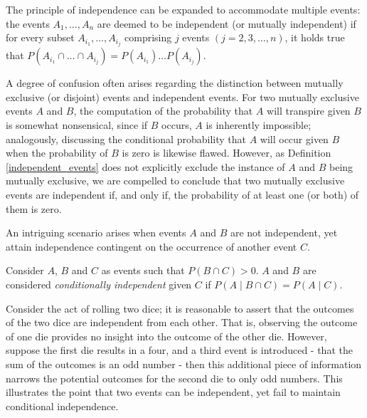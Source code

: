 The principle of independence can be expanded to accommodate multiple events: the events $A_{1}, \ldots, A_{n}$ are deemed to be independent (or mutually independent) if for every subset $A_{i_1}, \ldots, A_{i_j}$ comprising $j$ events $\left( j = 2, 3, \ldots, n \right)$, it holds true that $P \left( A_{i_1} \cap \ldots \cap A_{i_j} \right) = P \left( A_{i_1} \right) \ldots P \left( A_{i_j}\right)$.

\begin{example}
A degree of confusion often arises regarding the distinction between mutually exclusive (or disjoint) events and independent events. For two mutually exclusive events $A$ and $B$, the computation of the probability that $A$ will transpire given $B$ is somewhat nonsensical, since if $B$ occurs, $A$ is inherently impossible; analogously, discussing the conditional probability that $A$ will occur given $B$ when the probability of $B$ is zero is likewise flawed. However, as Definition \ref{independent_events} does not explicitly exclude the instance of $A$ and $B$ being mutually exclusive, we are compelled to conclude that two mutually exclusive events are independent if, and only if, the probability of at least one (or both) of them is zero.
\end{example}

An intriguing scenario arises when events $A$ and $B$ are not independent, yet attain independence contingent on the occurrence of another event $C$.

\begin{definition}
Consider $A$, $B$ and $C$ as events such that $P\left( B \cap C \right)>0$. $A$ and $B$ are considered \emph{conditionally independent} given $C$ if $P\left(A \mid B \cap C \right) = P\left( A \mid C \right)$.
\end{definition}

\begin{example}
Consider the act of rolling two dice; it is reasonable to assert that the outcomes of the two dice are independent from each other. That is, observing the outcome of one die provides no insight into the outcome of the other die. However, suppose the first die results in a four, and a third event is introduced - that the sum of the outcomes is an odd number - then this additional piece of information narrows the potential outcomes for the second die to only odd numbers. This illustrates the point that two events can be independent, yet fail to maintain conditional independence.
\end{example}

